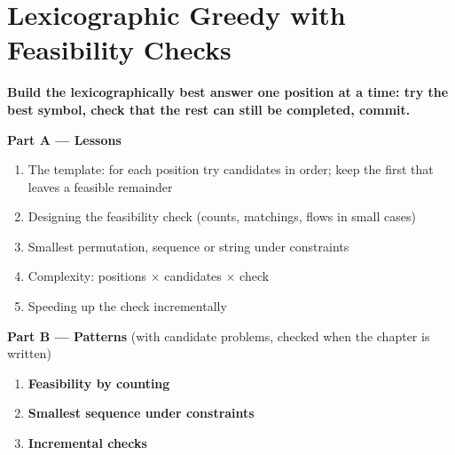 \chapter{Lexicographic Greedy with Feasibility Checks}
\label{ch:lexicographic}

\begin{tcolorbox}[enhanced, colback=white, colframe=secondaryblue, boxrule=1pt, arc=2mm]
\textbf{\large\textcolor{primaryblue}{Build the lexicographically best answer one position at a time: try the best symbol, check that the rest can still be completed, commit.}}
\end{tcolorbox}


\begin{plannedbox}
\textbf{Part A --- Lessons}
\begin{enumerate}[leftmargin=*, label=\textbf{A\arabic*.}, itemsep=1pt]
    \item The template: for each position try candidates in order; keep the first that leaves a feasible remainder
    \item Designing the feasibility check (counts, matchings, flows in small cases)
    \item Smallest permutation, sequence or string under constraints
    \item Complexity: positions $\times$ candidates $\times$ check
    \item Speeding up the check incrementally
\end{enumerate}
\textbf{Part B --- Patterns} (with candidate problems, checked when the chapter is written)
\begin{enumerate}[leftmargin=*, label=\textbf{P\arabic*.}, itemsep=1pt]
    \item \textbf{Feasibility by counting}
    \item \textbf{Smallest sequence under constraints}
    \item \textbf{Incremental checks}
\end{enumerate}
\end{plannedbox}
